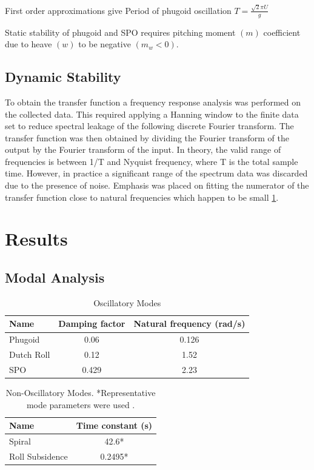 \documentclass{article}
\begin{document}
First order approximations give
Period of phugoid oscillation $T = \frac{\sqrt{2} \pi U}{g}$

Static stability of phugoid and SPO requires pitching moment $(m)$ coefficient due to heave $(w)$ to be negative $(m_w < 0)$.


\subsection{Dynamic Stability}


To obtain the transfer function a frequency response analysis was performed on the collected data.
This required applying a Hanning window to the finite data set to reduce spectral leakage of the following discrete Fourier transform.
The transfer function was then obtained by dividing the Fourier transform of the output by the Fourier transform of the input.
In theory, the valid range of frequencies is between 1/T and Nyquist frequency, where T is the total sample time.
However, in practice a significant range of the spectrum data was discarded due to the presence of noise.
Emphasis was placed on fitting the numerator of the transfer function close to natural frequencies which happen to be small \ref{tab:oscillatory_modes}.

\section{Results}

\subsection{Modal Analysis}


\begin{table}[H]
  \centering
  \begin{tabular}{lcc}
      \toprule
      Name & Damping factor & Natural frequency (rad/s) \\
      \midrule
      Phugoid & 0.06 & 0.126 \\
      Dutch Roll & 0.12 & 1.52 \\
      SPO & 0.429 & 2.23 \\
      \bottomrule
  \end{tabular}
  \caption{Oscillatory Modes}
    \label{tab:oscillatory_modes}
\end{table}

\begin{table}[H]
  \centering
  \begin{tabular}{lc}
      \toprule
      Name & Time constant (s) \\
      \midrule
      Spiral & 42.6* \\
      Roll Subsidence & 0.2495* \\
      \bottomrule
  \end{tabular}
  \caption{Non-Oscillatory Modes. *Representative mode parameters were used \cite{rep}.}
  \label{tab:non_oscillatory_modes}
\end{table}
\end{document}
